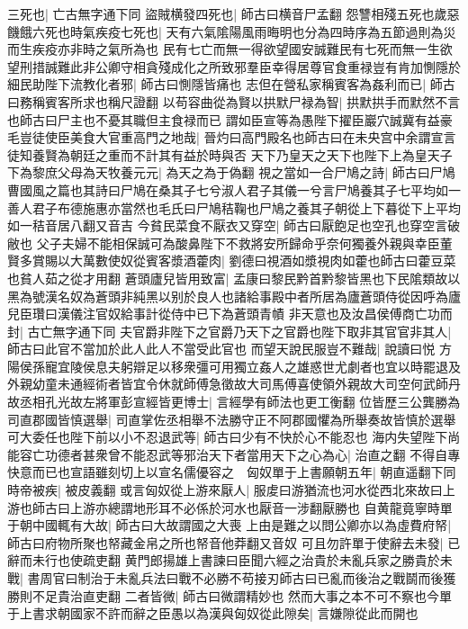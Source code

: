 三死也|{
	亡古無字通下同}
盜賊横發四死也|{
	師古曰横音尸孟翻}
怨讐相殘五死也歲惡饑餓六死也時氣疾疫七死也|{
	天有六氣隂陽風雨晦明也分為四時序為五節過則為災而生疾疫亦非時之氣所為也}
民有七亡而無一得欲望國安誠難民有七死而無一生欲望刑措誠難此非公卿守相貪殘成化之所致邪羣臣幸得居尊官食重禄豈有肯加惻隱於細民助陛下流教化者邪|{
	師古曰惻隱皆痛也}
志但在營私家稱賓客為姦利而已|{
	師古曰務稱賓客所求也稱尺證翻}
以苟容曲從為賢以拱默尸禄為智|{
	拱默拱手而默然不言也師古曰尸主也不憂其職但主食禄而已}
謂如臣宣等為愚陛下擢臣巖穴誠冀有益豪毛豈徒使臣美食大官重高門之地哉|{
	晉灼曰高門殿名也師古曰在未央宫中余謂宣言徒知養賢為朝廷之重而不計其有益於時與否}
天下乃皇天之天下也陛下上為皇天子下為黎庶父母為天牧養元元|{
	為天之為于偽翻}
視之當如一合尸鳩之詩|{
	師古曰尸鳩曹國風之篇也其詩曰尸鳩在桑其子七兮淑人君子其儀一兮言尸鳩養其子七平均如一善人君子布德施惠亦當然也毛氏曰尸鳩秸鞠也尸鳩之養其子朝從上下暮從下上平均如一秸音居八翻又音吉}
今貧民菜食不厭衣又穿空|{
	師古曰厭飽足也空孔也穿空言破敝也}
父子夫婦不能相保誠可為酸鼻陛下不救將安所歸命乎奈何獨養外親與幸臣董賢多賞賜以大萬數使奴從賓客漿酒藿肉|{
	劉德曰視酒如漿視肉如藿也師古曰藿豆菜也貧人茹之從才用翻}
蒼頭廬兒皆用致富|{
	孟康曰黎民黔首黔黎皆黑也下民隂類故以黑為號漢名奴為蒼頭非純黑以别於良人也諸給事殿中者所居為廬蒼頭侍從因呼為廬兒臣瓚曰漢儀注官奴給事計從侍中已下為蒼頭青幘}
非天意也及汝昌侯傅商亡功而封|{
	古亡無字通下同}
夫官爵非陛下之官爵乃天下之官爵也陛下取非其官官非其人|{
	師古曰此官不當加於此人此人不當受此官也}
而望天說民服豈不難哉|{
	說讀曰悦}
方陽侯孫寵宜陵侯息夫躬辯足以移衆彊可用獨立姦人之雄惑世尤劇者也宜以時罷退及外親幼童未通經術者皆宜令休就師傅急徵故大司馬傅喜使領外親故大司空何武師丹故丞相孔光故左將軍彭宣經皆更博士|{
	言經學有師法也更工衡翻}
位皆歷三公龔勝為司直郡國皆慎選舉|{
	司直掌佐丞相舉不法勝守正不阿郡國懼為所舉奏故皆慎於選舉}
可大委任也陛下前以小不忍退武等|{
	師古曰少有不快於心不能忍也}
海内失望陛下尚能容亡功德者甚衆曾不能忍武等邪治天下者當用天下之心為心|{
	治直之翻}
不得自專快意而已也宣語雖刻切上以宣名儒優容之　匈奴單于上書願朝五年|{
	朝直遥翻下同}
時帝被疾|{
	被皮義翻}
或言匈奴從上游來厭人|{
	服䖍曰游猶流也河水從西北來故曰上游也師古曰上游亦總謂地形耳不必係於河水也厭音一涉翻厭勝也}
自黄龍竟寧時單于朝中國輒有大故|{
	師古曰大故謂國之大喪}
上由是難之以問公卿亦以為虛費府帑|{
	師古曰府物所聚也帑藏金帛之所也帑音他莽翻又音奴}
可且勿許單于使辭去未發|{
	已辭而未行也使疏吏翻}
黄門郎揚雄上書諫曰臣聞六經之治貴於未亂兵家之勝貴於未戰|{
	書周官曰制治于未亂兵法曰戰不必勝不苟接刃師古曰已亂而後治之戰鬬而後獲勝則不足貴治直吏翻}
二者皆微|{
	師古曰微謂精妙也}
然而大事之本不可不察也今單于上書求朝國家不許而辭之臣愚以為漢與匈奴從此隙矣|{
	言嫌隙從此而開也}
